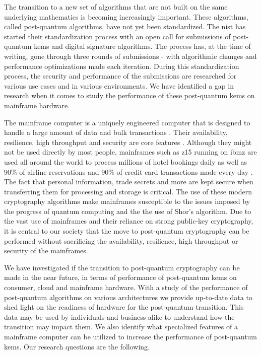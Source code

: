 The transition to a new set of algorithms that are not built on the same underlying mathematics is becoming increasingly important. These algorithms, called \gls{post-quantum} algorithms, have not yet been standardized. The \acrfull{nist} has started their standardization process with an open call for submissions of \gls{post-quantum} \glspl{kem} and digital signature algorithms. The process has, at the time of writing, gone through three rounds of submissions - with algorithmic changes and performance optimizations made each iteration. During this standardization process, the security and performance of the submissions are researched for various use cases and in various environments. We have identified a gap in research when it comes to study the performance of these \gls{post-quantum} \glspl{kem} on mainframe hardware.

The mainframe computer is a uniquely engineered computer that is designed to handle a large amount of data and bulk transactions \cite{mainframes}. Their availability, resilience, high throughput and security are core features \cite{mainframes}. Although they might not be used directly by most people, mainframes such as \gls{z15} running on \gls{ibmz} are used all around the world to process millions of hotel bookings daily as well as 90\% of airline reservations and 90\% of credit card transactions made every day \cite{jacobi2020}. The fact that personal information, trade secrets and more are kept secure when transferring them for processing and storage is critical. The use of these modern cryptography algorithms make mainframes susceptible to the issues imposed by the progress of quantum computing and the the use of Shor's algorithm. Due to the vast use of mainframes and their reliance on strong public-key cryptography, it is central to our society that the move to \gls{post-quantum} cryptography can be performed without sacrificing the availability, resilience, high throughput or security of the mainframes.

We have investigated if the transition to \gls{post-quantum} cryptography can be made in the near future, in terms of performance of \gls{post-quantum} \glspl{kem} on consumer, cloud and mainframe hardware. With a study of the performance of \gls{post-quantum} algorithms on various architectures we provide up-to-date data to shed light on the readiness of hardware for the \gls{post-quantum} transition. This data may be used by individuals and business alike to understand how the transition may impact them. We also identify what specialized features of a mainframe computer can be utilized to increase the performance of \gls{post-quantum} \glspl{kem}. Our research questions are the following.

